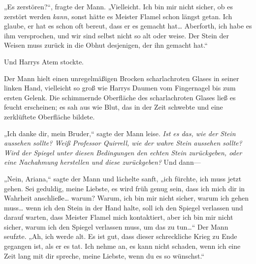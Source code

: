 „Es zerstören?“, fragte der Mann. „Vielleicht. Ich bin mir nicht sicher, ob es zerstört werden \emph{kann}, sonst hätte es Meister Flamel schon längst getan. Ich glaube, er hat es schon oft bereut, dass er es gemacht hat… Aberforth, ich habe es ihm versprochen, und wir sind selbst nicht so alt oder weise. Der Stein der Weisen muss zurück in die Obhut desjenigen, der ihn gemacht hat.“

Und Harrys Atem stockte.

Der Mann hielt einen unregelmäßigen Brocken scharlachroten Glases in seiner linken Hand, vielleicht so groß wie Harrys Daumen vom Fingernagel bis zum ersten Gelenk. Die schimmernde Oberfläche des scharlachroten Glases ließ es feucht erscheinen; es sah aus wie Blut, das in der Zeit schwebte und eine zerklüftete Oberfläche bildete.

„Ich danke dir, mein Bruder,“ sagte der Mann leise.
\emph{Ist es das, wie der Stein aussehen sollte? Weiß Professor Quirrell, wie der wahre Stein aussehen sollte? Wird der Spiegel unter diesen Bedingungen den echten Stein zurückgeben, oder eine Nachahmung herstellen und diese zurückgeben?}
Und dann—

„Nein, Ariana,“ sagte der Mann und lächelte sanft, „ich fürchte, ich muss jetzt gehen. Sei geduldig, meine Liebste, es wird früh genug sein, dass ich mich dir in Wahrheit anschließe… warum? Warum, ich bin mir nicht sicher, warum ich gehen muss… wenn ich den Stein in der Hand halte, soll ich den Spiegel verlassen und darauf warten, dass Meister Flamel mich kontaktiert, aber ich bin mir nicht sicher, warum ich den Spiegel verlassen muss, um das zu tun…“
Der Mann seufzte.
„Ah, ich werde alt. Es ist gut, dass dieser schreckliche Krieg zu Ende gegangen ist, als er es tat. Ich nehme an, es kann nicht schaden, wenn ich eine Zeit lang mit dir spreche, meine Liebste, wenn du es so wünschst.“


